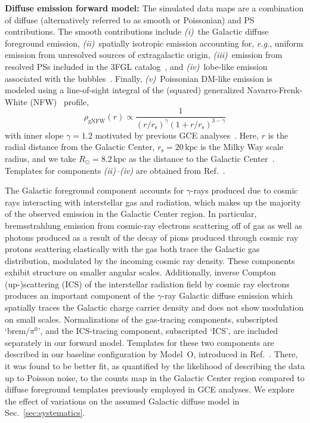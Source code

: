 \documentclass[prd,aps,10pt,nofootinbib,twocolumn,superscriptaddress,preprintnumbers,balancelastpage,longbibliography,floatfix]{revtex4-2}
\begin{document}
\noindent
\textbf{Diffuse emission forward model:} The simulated data maps are a combination of diffuse (alternatively referred to as smooth or Poissonian) and PS contributions. The smooth contributions include \emph{(i)}~the Galactic diffuse foreground emission, \emph{(ii)}~spatially isotropic emission accounting for, \emph{e.g.}, uniform emission from unresolved sources of extragalactic origin, \emph{(iii)}~emission from resolved PSs included in the \Fermi 3FGL catalog~\cite{Fermi-LAT:2015bhf}, and \emph{(iv)}~lobe-like emission associated with the \Fermi bubbles~\cite{Su:2010qj}. Finally, \emph{(v)}~Poissonian DM-like emission is modeled using a line-of-sight integral of the (squared) generalized Navarro-Frenk-White (NFW)~\cite{Navarro:1995iw,Navarro:1996gj} profile,
\begin{equation}
\label{eq:nfw}
\rho_\mathrm{gNFW}(r) \propto \frac{1}{\left(r / r_{\mathrm s}\right)^{\gamma}\left(1+r / r_{\mathrm s}\right)^{3-\gamma}}
\end{equation}
with inner slope $\gamma=1.2$ motivated by previous GCE analyses~\cite{Gordon:2013vta,Daylan:2014rsa,Zhou:2014lva}. Here, $r$ is the radial distance from the Galactic Center, $r_{\mathrm s}=20\,\mathrm{kpc}$ is the Milky Way scale radius, and we take $R_\odot = 8.2\,\mathrm{kpc}$ as the distance to the Galactic Center~\cite{2020arXiv201202169B,2019A&A...625L..10G}. Templates for components \emph{(ii)--(iv)} are obtained from Ref.~\cite{Mishra-Sharma:2016gis}. 

The Galactic foreground component accounts for $\gamma$-rays produced due to cosmic rays interacting with interstellar gas and radiation, which makes up the majority of the observed emission in the Galactic Center region. In particular, bremsstrahlung emission from cosmic-ray electrons scattering off of gas as well as photons produced as a result of the decay of pions produced through cosmic ray protons scattering elastically with the gas both trace the Galactic gas distribution, modulated by the incoming cosmic ray density. These components exhibit structure on smaller angular scales. Additionally, inverse Compton (up-)scattering (ICS) of the interstellar radiation field by cosmic ray electrons produces an important component of the $\gamma$-ray Galactic diffuse emission which spatially traces the Galactic charge carrier density and does not show modulation on small scales. Normalizations of the gas-tracing components, subscripted `brem/$\pi^0$', and the ICS-tracing component, subscripted `ICS', are included separately in our forward model. Templates for these two components are described in our baseline configuration by {Model~O}, introduced in Ref.~\cite{Buschmann:2020adf}. There, it was found to be better fit, as quantified by the likelihood of describing the data up to Poisson noise, to the counts map in the Galactic Center region compared to diffuse foreground templates previously employed in GCE analyses. We explore the effect of variations on the assumed Galactic diffuse model in Sec.~\ref{sec:systematics}. 
\end{document}
